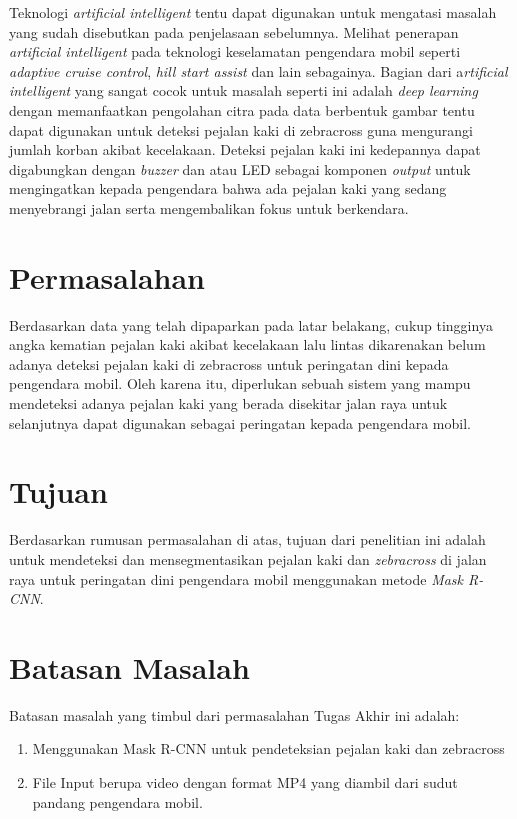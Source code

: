 Teknologi \textit{artificial intelligent} tentu dapat digunakan untuk mengatasi masalah yang sudah disebutkan pada penjelasaan sebelumnya. Melihat penerapan \textit{artificial intelligent} pada teknologi keselamatan pengendara mobil seperti \textit{adaptive cruise control}, \textit{hill start assist} dan lain sebagainya. Bagian dari a\textit{rtificial intelligent} yang sangat cocok untuk masalah seperti ini adalah \textit{deep learning} dengan memanfaatkan pengolahan citra pada data berbentuk gambar tentu dapat digunakan untuk deteksi pejalan kaki di zebracross guna mengurangi jumlah korban akibat kecelakaan. Deteksi pejalan kaki ini kedepannya dapat digabungkan dengan \textit{buzzer} dan atau LED sebagai komponen \textit{output} untuk mengingatkan kepada pengendara bahwa ada pejalan kaki yang sedang menyebrangi jalan serta mengembalikan fokus untuk berkendara.

\section{Permasalahan}
\label{sec:permasalahan}

Berdasarkan data yang telah dipaparkan pada latar belakang, cukup tingginya angka kematian pejalan kaki akibat kecelakaan lalu lintas dikarenakan belum adanya deteksi pejalan kaki di zebracross untuk peringatan dini kepada pengendara mobil. Oleh karena itu, diperlukan sebuah sistem yang mampu mendeteksi adanya pejalan kaki yang berada disekitar jalan raya untuk selanjutnya dapat digunakan sebagai peringatan kepada pengendara mobil.

\section{Tujuan}
\label{sec:Tujuan}

Berdasarkan rumusan permasalahan di atas, tujuan dari penelitian ini adalah untuk mendeteksi dan mensegmentasikan pejalan kaki dan \textit{zebracross} di jalan raya untuk peringatan dini pengendara mobil menggunakan metode \textit{Mask R-CNN}.



\section{Batasan Masalah}
\label{sec:batasanmasalah}

Batasan masalah yang timbul dari permasalahan Tugas Akhir ini adalah:

\begin{enumerate}[nolistsep]

  \item Menggunakan Mask R-CNN untuk pendeteksian pejalan kaki dan zebracross
  \item File Input berupa video dengan format MP4 yang diambil dari sudut pandang pengendara mobil. 

\end{enumerate}


